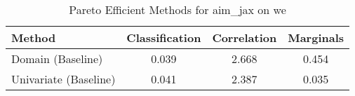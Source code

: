 \begin{table}[t!]
    \centering
    \caption{Pareto Efficient Methods for aim_jax on we}
    \label{tab:pareto_efficient_methods_aim_jax_we}
    \begin{tabular}{lccc}
    \toprule
    Method & Classification & Correlation & Marginals \\
    \midrule
    Domain (Baseline) & \cellcolor{gold!30}0.039 & \cellcolor{silver!30}2.668 & \cellcolor{silver!30}0.454 \\
    Univariate (Baseline) & \cellcolor{silver!30}0.041 & \cellcolor{gold!30}2.387 & \cellcolor{gold!30}0.035 \\
    \bottomrule
    \end{tabular}
\end{table}